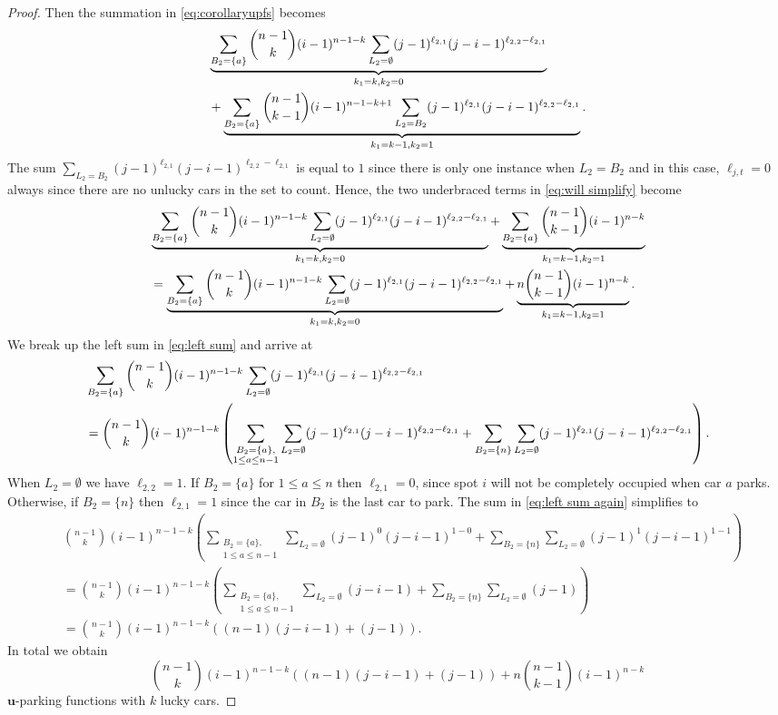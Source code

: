 \documentclass[reqno]{amsart}
\theoremstyle{definition}
\theoremstyle{remark}
\newcommand{\bsy}{\boldsymbol}
\begin{document}
\begin{proof}
Then the summation in \eqref{eq:corollaryupfs} becomes
\begin{align}
\notag
&\underbrace{\sum_{B_2 = \{a\}}\binom{n-1}{k}(i-1)^{n-1-k} \sum_{L_2 = \emptyset}  (j-1)^{\ell_{2,1}} (j-i-1)^{\ell_{2,2}-\ell_{2,1}}}_{k_1=k,k_2=0}\\
&+ \underbrace{\sum_{B_2 = \{a\}}\binom{n-1}{k-1}(i-1)^{n-1-k+1} \sum_{L_2= B_2}  (j-1)^{\ell_{2,1}} (j-i-1)^{\ell_{2,2}-\ell_{2,1}}}_{k_1=k-1,k_2=1}.\label{eq:will simplify}
\end{align}
The sum $\sum_{L_2= B_2} (j-1)^{\ell_{2,1}} (j-i-1)^{\ell_{2,2}-\ell_{2,1}}$ is equal to $1$ since there is only one instance when $L_2 = B_2$ and in this case, $\ell_{j,t}=0$ always since there are no unlucky cars in the set to count. Hence, the two underbraced terms in \eqref{eq:will simplify} become
\begin{align}
&\underbrace{\sum_{B_2 = \{a\}}\binom{n-1}{k}(i-1)^{n-1-k} \sum_{L_2 = \emptyset}  (j-1)^{\ell_{2,1}} (j-i-1)^{\ell_{2,2}-\ell_{2,1}}}_{k_1=k,k_2=0}+ \underbrace{\sum_{B_2 = \{a\}}\binom{n-1}{k-1}(i-1)^{n-k} }_{k_1=k-1,k_2=1} \notag\\
&= \underbrace{\sum_{B_2 = \{a\}}\binom{n-1}{k}(i-1)^{n-1-k} \sum_{L_2 = \emptyset} (j-1)^{\ell_{2,1}} (j-i-1)^{\ell_{2,2}-\ell_{2,1}}}_{k_1=k,k_2=0}+ \underbrace{n\binom{n-1}{k-1}(i-1)^{n-k} }_{k_1=k-1,k_2=1} .\label{eq:left sum}
\end{align}
We break up the left sum in \eqref{eq:left sum}
and arrive at
\begin{align}
    &\sum_{B_2 = \{a\}}\binom{n-1}{k}(i-1)^{n-1-k} \sum_{L_2 = \emptyset}  (j-1)^{\ell_{2,1}} (j-i-1)^{\ell_{2,2}-\ell_{2,1}}\notag\\
&=\binom{n-1}{k}(i-1)^{n-1-k}\left(\sum_{\substack{B_2 = \{a\},\\ 1\leq a\leq n-1}}
 \sum_{L_2 = \emptyset}  (j-1)^{\ell_{2,1}} (j-i-1)^{\ell_{2,2}-\ell_{2,1}}+\sum_{B_2 = \{n\}}\sum_{L_2 = \emptyset}  (j-1)^{\ell_{2,1}} (j-i-1)^{\ell_{2,2}-\ell_{2,1}}\right).\label{eq:left sum again}
\end{align} 
When $L_2 = \emptyset$ we have $\ell_{2,2}=1$. If $B_2 = \{a\}$ for $1\leq a \leq n$ then $\ell_{2,1}=0$, since spot $i$ will not be completely occupied when car $a$ parks. 
Otherwise, if  $B_2 = \{n\}$ then $\ell_{2,1}=1$ since the car in $B_2$ is the last car to park.
The sum in \eqref{eq:left sum again} simplifies to
\begin{align*}
&\binom{n-1}{k}(i-1)^{n-1-k}\left(\sum_{\substack{B_2 = \{a\},\\ 1\leq a\leq n-1}}
 \sum_{L_2 = \emptyset}  (j-1)^{0} (j-i-1)^{1-0}+\sum_{B_2 = \{n\}}\sum_{L_2 = \emptyset}  (j-1)^{1} (j-i-1)^{1-1} \right)\\
 &=\binom{n-1}{k}(i-1)^{n-1-k}\left(\sum_{\substack{B_2 = \{a\},\\ 1\leq a\leq n-1}}
 \sum_{L_2 = \emptyset}  (j-i-1)+\sum_{B_2 = \{n\}}\sum_{L_2 = \emptyset}  (j-1) \right)\\
 &=\binom{n-1}{k}(i-1)^{n-1-k} \left((n-1)  (j-i-1)+ (j-1) \right).
\end{align*} 
In total we obtain
\[\binom{n-1}{k}(i-1)^{n-1-k} \left((n-1)  (j-i-1)+ (j-1) \right)+n\binom{n-1}{k-1}(i-1)^{n-k}
\]
$\bsy{u}$-parking functions with $k$ lucky cars.


\end{proof}
\end{document}
